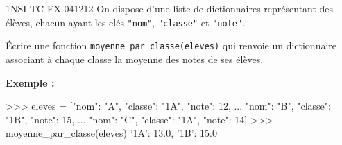 \begin{exercice}{1NSI-TC-EX-041}{2}{12}
On dispose d'une liste de dictionnaires représentant des élèves, chacun ayant
les clés \lstinline{"nom"}, \lstinline{"classe"} et \lstinline{"note"}.

Écrire une fonction \lstinline{moyenne_par_classe(eleves)} qui renvoie un
dictionnaire associant à chaque classe la moyenne des notes de ses élèves.

\textbf{Exemple :}
\begin{console}
>>> eleves = [{"nom": "A", "classe": "1A", "note": 12},
...           {"nom": "B", "classe": "1B", "note": 15},
...           {"nom": "C", "classe": "1A", "note": 14}]
>>> moyenne_par_classe(eleves)
{'1A': 13.0, '1B': 15.0}
\end{console}
\end{exercice}
